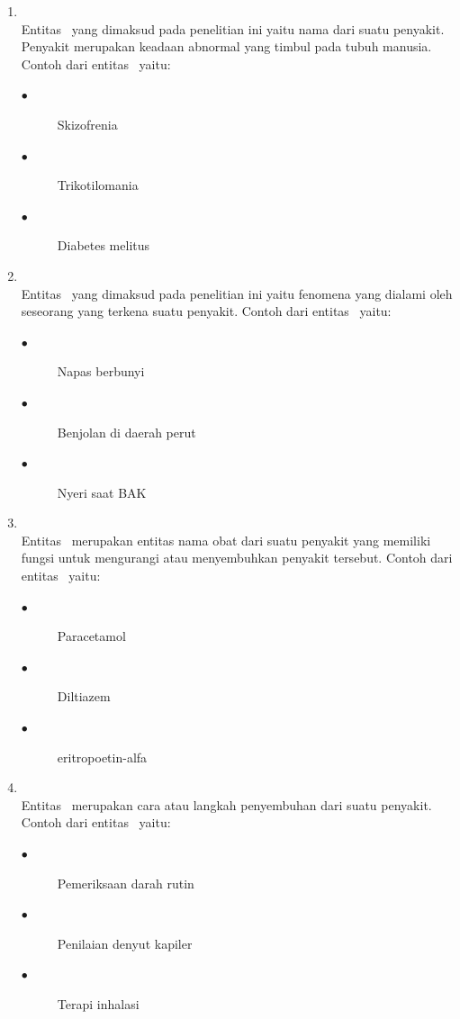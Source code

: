 \begin{enumerate}
	\item \Disease\\
	Entitas \disease~yang dimaksud pada penelitian ini yaitu nama dari suatu penyakit. Penyakit merupakan keadaan abnormal yang timbul pada tubuh manusia. Contoh dari entitas \disease~yaitu:
	\begin{description}
		\item[$\bullet$] Skizofrenia
		\item[$\bullet$] Trikotilomania
		\item[$\bullet$] Diabetes melitus
	\end{description}

	\item \Symptom\\
	Entitas \symptom~yang dimaksud pada penelitian ini yaitu fenomena yang dialami oleh seseorang yang terkena suatu penyakit. Contoh dari entitas \symptom~yaitu:
	\begin{description}
		\item[$\bullet$] Napas berbunyi
		\item[$\bullet$] Benjolan di daerah perut
		\item[$\bullet$] Nyeri saat BAK
	\end{description}

	\item \Drug\\
	Entitas \drug~merupakan entitas nama obat dari suatu penyakit yang memiliki fungsi untuk mengurangi atau menyembuhkan penyakit tersebut. Contoh dari entitas \drug~yaitu:
	\begin{description}
		\item[$\bullet$] Paracetamol
		\item[$\bullet$] Diltiazem
		\item[$\bullet$] eritropoetin-alfa
	\end{description}

	\item \Treatment\\
	Entitas \treatment~merupakan cara atau langkah penyembuhan dari suatu penyakit. Contoh dari entitas \treatment~yaitu:
	\begin{description}
		\item[$\bullet$] Pemeriksaan darah rutin
		\item[$\bullet$] Penilaian denyut kapiler
		\item[$\bullet$] Terapi inhalasi
	\end{description}
\end{enumerate}
	
